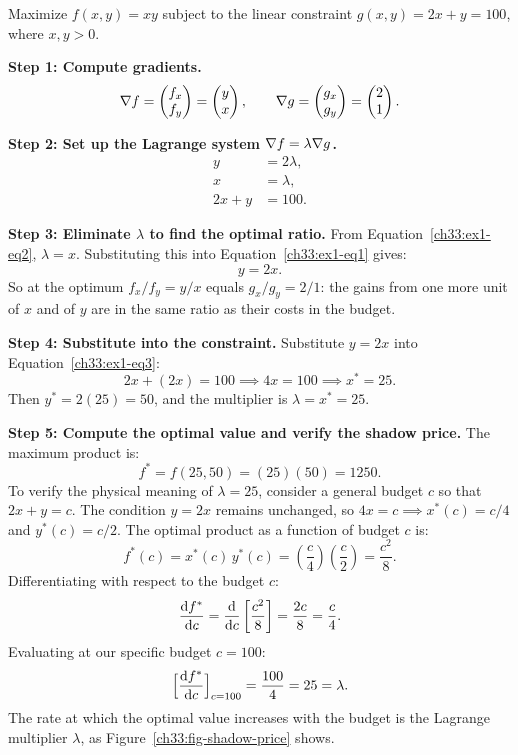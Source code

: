 \begin{example}
\label{ch33:ex-lagrange-linear}
Maximize $f(x,y) = xy$ subject to the linear constraint $g(x,y) = 2x + y = 100$, where $x, y > 0$.

\textbf{Step 1: Compute gradients.}
\[
\nabla f = \begin{pmatrix} f_x \\ f_y \end{pmatrix} = \begin{pmatrix} y \\ x \end{pmatrix}, \qquad
\nabla g = \begin{pmatrix} g_x \\ g_y \end{pmatrix} = \begin{pmatrix} 2 \\ 1 \end{pmatrix}.
\]

\textbf{Step 2: Set up the Lagrange system $\nabla f = \lambda \nabla g$.}
\begin{align}
y &= 2\lambda, \label{ch33:ex1-eq1} \\
x &= \lambda, \label{ch33:ex1-eq2} \\
2x + y &= 100. \label{ch33:ex1-eq3}
\end{align}

\textbf{Step 3: Eliminate $\lambda$ to find the optimal ratio.}
From Equation~\eqref{ch33:ex1-eq2}, $\lambda = x$. Substituting this into Equation~\eqref{ch33:ex1-eq1} gives:
\[
y = 2x.
\]
So at the optimum $f_x/f_y = y/x$ equals $g_x/g_y = 2/1$: the gains from one more unit of $x$ and of $y$ are in the same ratio as their costs in the budget.

\textbf{Step 4: Substitute into the constraint.}
Substitute $y = 2x$ into Equation~\eqref{ch33:ex1-eq3}:
\[
2x + (2x) = 100 \implies 4x = 100 \implies x^* = 25.
\]
Then $y^* = 2(25) = 50$, and the multiplier is $\lambda = x^* = 25$.

\textbf{Step 5: Compute the optimal value and verify the shadow price.}
The maximum product is:
\[
f^* = f(25, 50) = (25)(50) = 1250.
\]
To verify the physical meaning of $\lambda = 25$, consider a general budget $c$ so that $2x + y = c$. The condition $y = 2x$ remains unchanged, so $4x = c \implies x^*(c) = c/4$ and $y^*(c) = c/2$. The optimal product as a function of budget $c$ is:
\[
f^*(c) = x^*(c)\,y^*(c) = \left(\frac{c}{4}\right)\left(\frac{c}{2}\right) = \frac{c^2}{8}.
\]
Differentiating with respect to the budget $c$:
\[
\frac{\mathrm{d} f^*}{\mathrm{d} c} = \frac{\mathrm{d} }{\mathrm{d} c}\left[\frac{c^2}{8}\right] = \frac{2c}{8} = \frac{c}{4}.
\]
Evaluating at our specific budget $c = 100$:
\[
\Big[\frac{\mathrm{d} f^*}{\mathrm{d} c}\Big]_{c=100} = \frac{100}{4} = 25 = \lambda.
\]
The rate at which the optimal value increases with the budget is the Lagrange multiplier $\lambda$, as Figure~\ref{ch33:fig-shadow-price} shows.


\end{example}
